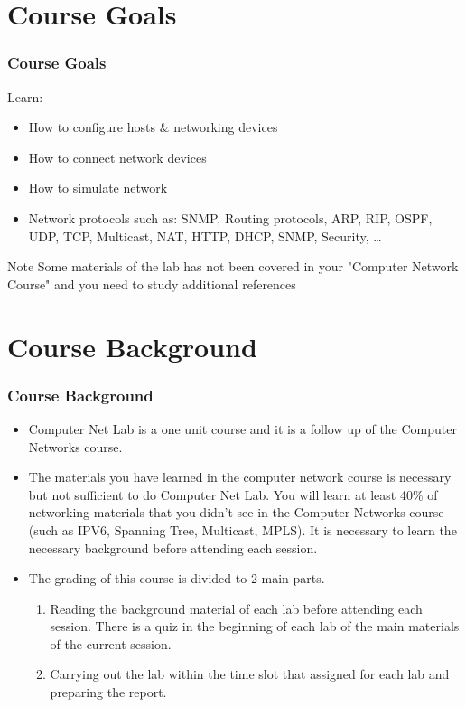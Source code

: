 \documentclass[aspectratio=169,15pt]{beamer}
\begin{document}
\section{Course Goals}
\begin{frame}
    \frametitle{Course Goals}

    Learn:
    \begin{itemize}
        \item How to configure hosts \& networking devices
        \item How to connect network devices
        \item How to simulate network
        \item Network protocols such as: SNMP, Routing protocols, ARP, RIP, OSPF, UDP, TCP, Multicast, NAT, HTTP, DHCP, SNMP, Security, \dots
    \end{itemize}

    \begin{alertblock}{Note}
        Some materials of the lab has not been covered in your "Computer Network Course" and you need to study additional references
    \end{alertblock}

\end{frame}

\section{Course Background}
\begin{frame}
    \frametitle{Course Background}

    \begin{itemize}
        \item Computer Net Lab is a one unit course and it is a follow up of the Computer Networks course.
        \item The materials you have learned in the computer network course is necessary but not sufficient to do Computer Net Lab.
        You will learn at least 40\% of networking materials that you didn’t see in the Computer Networks course (such as IPV6, Spanning Tree, Multicast, MPLS).
        It is necessary to learn the necessary background before attending each session.
        \item The grading of this course is divided to 2 main parts.
        \begin{enumerate}
            \item Reading the background material of each lab before attending each session.
            There is a quiz in the beginning of each lab of the main materials of the current session.
            \item Carrying out the lab within the time slot that assigned for each lab and preparing the report.
        \end{enumerate}
    \end{itemize}

\end{frame}
\end{document}
